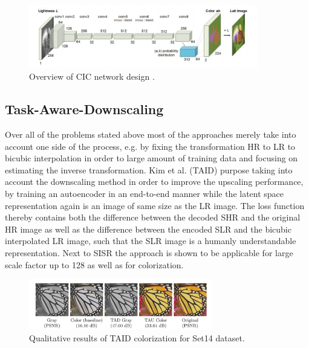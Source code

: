 \begin{figure}[!htbp]
	\centering
	\includegraphics[width=10cm]{figures/cic}
	\caption{Overview of CIC network design \cite{CIC}.}
  \label{fig:cic}
\end{figure}

\subsection{Task-Aware-Downscaling}
Over all of the problems stated above most of the approaches merely take into
account one side of the process, e.g. by fixing the transformation HR to LR
to bicubic interpolation in order to large amount of training data and focusing
on estimating the inverse transformation. Kim et al. \cite{TAID} (TAID) purpose taking
into account the downscaling method in order to improve the upscaling performance,
by training an autoencoder in an end-to-end manner while the latent space
representation again is an image of same size as the LR image. The loss function
thereby contains both the difference between the decoded SHR and the original HR
image as well as the difference between the encoded SLR and the bicubic
interpolated LR image, such that the SLR image is a humanly understandable
representation. Next to SISR the approach is shown to be applicable for large
scale factor up to 128 as well as for colorization.

\begin{figure}[!htbp]
	\centering
	\includegraphics[width=8cm]{figures/taid_colorization}
	\caption{Qualitative results of TAID colorization for Set14 dataset.}
  \label{fig:taid_colorization}
\end{figure}

%
